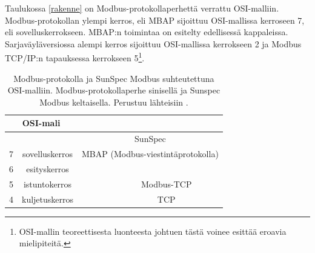     Taulukossa \ref{rakenne} on Modbus-protokollaperhettä verrattu \gls{OSI}-malliin. Modbus-protokollan ylempi kerros, eli \gls{MBAP} sijoittuu \gls{OSI}-mallissa kerroseen 7, eli sovelluskerrokseen. \gls{MBAP}:n toimintaa on esitelty edellisessä kappaleissa. Sarjaväyläversiossa alempi kerros sijoittuu \gls{OSI}-mallissa kerrokseen 2 ja Modbus TCP/IP:n tapauksessa kerrokseen 5\footnote{\gls{OSI}-mallin teoreettisesta luonteesta johtuen tästä voinee esittää eroavia mielipiteitä.}.
    \begin{table}
      \centering
      \caption[Modbus-protokollan rakenne, \gls{OSI}-malli ja SunSpec]{Modbus-protokolla ja  SunSpec Modbus suhteutettuna \gls{OSI}-malliin. Modbus-protokollaperhe sinisellä ja Sunspec Modbus keltaisella. Perustuu lähteisiin \parencite{osi, modbusSerialSpec, modbusTCPIPSpec, SSTech}.}
      \begin{tabular}{|c|c|ccc}
      \cline{1-2}
      \multicolumn{2}{|c|}{OSI-mali}                                               & \multicolumn{3}{c}{}                                                                                                                                                                \\ \hline
      \multicolumn{1}{|l|}{}                    &                                  & \multicolumn{3}{c|}{\cellcolor[HTML]{FFFFC7}SunSpec}                                                                                                                                \\ \cline{3-5}
      \multicolumn{1}{|l|}{\multirow{-2}{*}{7}} & \multirow{-2}{*}{sovelluskerros} & \multicolumn{3}{c|}{\cellcolor[HTML]{6F6FE6}\gls{MBAP} (Modbus-viestintäprotokolla)}                                                                                                      \\ \hline
      6                                         & esityskerros                     &                                                         &                                                           & \multicolumn{1}{c|}{}                                         \\ \cline{1-2} \cline{5-5}
      5                                         & istuntokerros                    &                                                         & \multicolumn{1}{c|}{}                                     & \multicolumn{1}{c|}{\cellcolor[HTML]{6F6FE6}Modbus-\gls{TCP}} \\ \cline{1-2} \cline{5-5}
      4                                         & kuljetuskerros                   &                                                         & \multicolumn{1}{c|}{}                                     & \multicolumn{1}{c|}{\gls{TCP}}                                \\ \cline{1-2} \cline{5-5}

\end{tabular}
\end{table}
